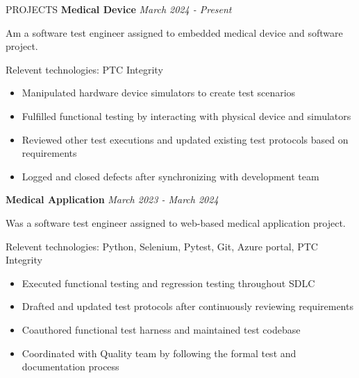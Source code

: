 \documentclass{ResumeFormat} %
\begin{document}
\begin{rSection}{PROJECTS}
\textbf{Medical Device} {} \hfill {\emph{March 2024 - Present}}

Am a software test engineer assigned to embedded medical device and software project.

Relevent technologies: PTC Integrity
\begin{itemize}
    \itemsep -3pt {}
     \item Manipulated hardware device simulators to create test scenarios
     \item Fulfilled functional testing by interacting with physical device and simulators
     \item Reviewed other test executions and updated existing test protocols based on requirements
     \item Logged and closed defects after synchronizing with development team
\end{itemize}
\vspace{0.5em}
\textbf{Medical Application} {} \hfill {\emph{March 2023 - March 2024}}

Was a software test engineer assigned to web-based medical application project.

Relevent technologies: Python, Selenium, Pytest, Git, Azure portal, PTC Integrity
\begin{itemize}
    \itemsep -3pt {}
     \item Executed functional testing and regression testing throughout SDLC
     \item Drafted and updated test protocols after continuously reviewing requirements
     \item Coauthored functional test harness and maintained test codebase
     \item Coordinated with Quality team by following the formal test and documentation process
\end{itemize}
\end{rSection} 




\end{document}
